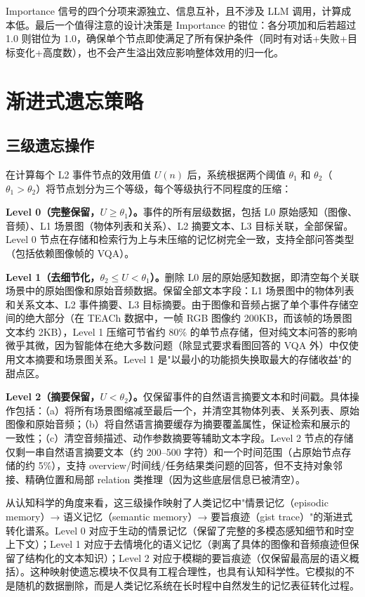 Importance 信号的四个分项来源独立、信息互补，且不涉及 LLM 调用，计算成本低。最后一个值得注意的设计决策是 Importance 的钳位：各分项加和后若超过 1.0 则钳位为 1.0，确保单个节点即使满足了所有保护条件（同时有对话+失败+目标变化+高度数），也不会产生溢出效应影响整体效用的归一化。

\section{渐进式遗忘策略}

\subsection{三级遗忘操作}

在计算每个 L2 事件节点的效用值 $U(n)$ 后，系统根据两个阈值 $\theta_1$ 和 $\theta_2$（$\theta_1 > \theta_2$）将节点划分为三个等级，每个等级执行不同程度的压缩：

\textbf{Level 0（完整保留，$U \ge \theta_1$）。}事件的所有层级数据，包括 L0 原始感知（图像、音频）、L1 场景图（物体列表和关系）、L2 摘要文本、L3 目标关联，全部保留。Level 0 节点在存储和检索行为上与未压缩的记忆树完全一致，支持全部问答类型（包括依赖图像帧的 VQA）。

\textbf{Level 1（去细节化，$\theta_2 \le U < \theta_1$）。}删除 L0 层的原始感知数据，即清空每个关联场景中的原始图像和原始音频数据。保留全部文本字段：L1 场景图中的物体列表和关系文本、L2 事件摘要、L3 目标摘要。由于图像和音频占据了单个事件存储空间的绝大部分（在 TEACh 数据中，一帧 RGB 图像约 200KB，而该帧的场景图文本约 2KB），Level 1 压缩可节省约 80\% 的单节点存储，但对纯文本问答的影响微乎其微，因为智能体在绝大多数问题（除显式要求看图回答的 VQA 外）中仅使用文本摘要和场景图关系。Level 1 是"以最小的功能损失换取最大的存储收益"的甜点区。

\textbf{Level 2（摘要保留，$U < \theta_2$）。}仅保留事件的自然语言摘要文本和时间戳。具体操作包括：（a）将所有场景图缩减至最后一个，并清空其物体列表、关系列表、原始图像和原始音频；（b）将自然语言摘要缓存为摘要覆盖属性，保证检索和展示的一致性；（c）清空音频描述、动作参数摘要等辅助文本字段。Level 2 节点的存储仅剩一串自然语言摘要文本（约 200–500 字符）和一个时间范围（占原始节点存储的约 5\%），支持 overview/时间线/任务结果类问题的回答，但不支持对象邻接、精确位置和局部 relation 类推理（因为这些底层信息已被清空）。

从认知科学的角度来看，这三级操作映射了人类记忆中"情景记忆（episodic memory）→ 语义记忆（semantic memory）→ 要旨痕迹（gist trace）"的渐进式转化谱系。Level 0 对应于生动的情景记忆（保留了完整的多模态感知细节和时空上下文）；Level 1 对应于去情境化的语义记忆（剥离了具体的图像和音频痕迹但保留了结构化的文本知识）；Level 2 对应于模糊的要旨痕迹（仅保留最高层的语义概括）。这种映射使遗忘模块不仅具有工程合理性，也具有认知科学性。它模拟的不是随机的数据删除，而是人类记忆系统在长时程中自然发生的记忆表征转化过程。

